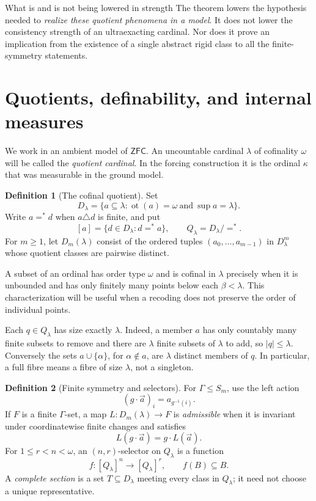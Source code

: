 \documentclass[11pt,letterpaper]{article}
\theoremstyle{definition}
\newtheorem{definition}{Definition}[section]
\numberwithin{equation}{section}
\newcommand{\ZFC}{\mathsf{ZFC}}
\newcommand{\ot}{\operatorname{ot}}
\begin{document}
\begin{assessment}{What is and is not being lowered in strength}
The theorem lowers the hypothesis needed to \emph{realize these quotient phenomena in a model}. It does not lower the consistency strength of an ultraexacting cardinal. Nor does it prove an implication from the existence of a single abstract rigid class to all the finite-symmetry statements.
\end{assessment}

\section{Quotients, definability, and internal measures}\label{sec:notation}

We work in an ambient model of $\ZFC$. An uncountable cardinal $\lambda$ of cofinality $\omega$ will be called the \emph{quotient cardinal}. In the forcing construction it is the ordinal $\kappa$ that was measurable in the ground model.

\begin{definition}[The cofinal quotient]
Set
\[
D_\lambda=\{a\subseteq\lambda:\ot(a)=\omega\ \text{and}\ \sup a=\lambda\}.
\]
Write $a=^*d$ when $a\triangle d$ is finite, and put
\[
[a]=\{d\in D_\lambda:d=^*a\},\qquad Q_\lambda=D_\lambda/=^*.
\]
For $m\ge1$, let $D_m(\lambda)$ consist of the ordered tuples $(a_0,\ldots,a_{m-1})$ in $D_\lambda^m$ whose quotient classes are pairwise distinct.
\end{definition}

A subset of an ordinal has order type $\omega$ and is cofinal in $\lambda$ precisely when it is unbounded and has only finitely many points below each $\beta<\lambda$. This characterization will be useful when a recoding does not preserve the order of individual points.

Each $q\in Q_\lambda$ has size exactly $\lambda$. Indeed, a member $a$ has only countably many finite subsets to remove and there are $\lambda$ finite subsets of $\lambda$ to add, so $|q|\le\lambda$. Conversely the sets $a\cup\{\alpha\}$, for $\alpha\notin a$, are $\lambda$ distinct members of $q$. In particular, a full fibre means a fibre of size $\lambda$, not a singleton.

\begin{definition}[Finite symmetry and selectors]
For $\Gamma\le S_m$, use the left action
\[
(g\cdot\vec a)_i=a_{g^{-1}(i)}.
\]
If $F$ is a finite $\Gamma$-set, a map $L:D_m(\lambda)\to F$ is \emph{admissible} when it is invariant under coordinatewise finite changes and satisfies
\[
L(g\cdot\vec a)=g\cdot L(\vec a).
\]
For $1\le r<n<\omega$, an $(n,r)$-selector on $Q_\lambda$ is a function
\[
f:[Q_\lambda]^n\longrightarrow[Q_\lambda]^r,
\qquad f(B)\subseteq B.
\]
A \emph{complete section} is a set $T\subseteq D_\lambda$ meeting every class in $Q_\lambda$; it need not choose a unique representative.
\end{definition}
\end{document}
